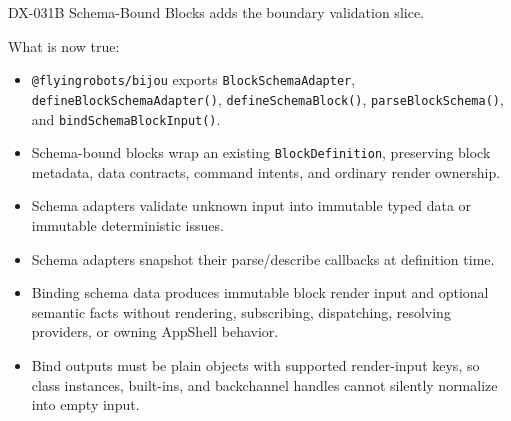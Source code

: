 DX-031B Schema-Bound Blocks adds the boundary validation slice.

What is now true:

\begin{itemize}
\tightlist
\item
  \texttt{@\allowbreak{}f\allowbreak{}l\allowbreak{}y\allowbreak{}i\allowbreak{}n\allowbreak{}g\allowbreak{}r\allowbreak{}o\allowbreak{}b\allowbreak{}o\allowbreak{}t\allowbreak{}s\allowbreak{}/\allowbreak{}b\allowbreak{}i\allowbreak{}j\allowbreak{}o\allowbreak{}u} exports \texttt{B\allowbreak{}l\allowbreak{}o\allowbreak{}c\allowbreak{}k\allowbreak{}S\allowbreak{}c\allowbreak{}h\allowbreak{}e\allowbreak{}m\allowbreak{}a\allowbreak{}A\allowbreak{}d\allowbreak{}a\allowbreak{}p\allowbreak{}t\allowbreak{}e\allowbreak{}r}, \texttt{d\allowbreak{}e\allowbreak{}f\allowbreak{}i\allowbreak{}n\allowbreak{}e\allowbreak{}B\allowbreak{}l\allowbreak{}o\allowbreak{}c\allowbreak{}k\allowbreak{}S\allowbreak{}c\allowbreak{}h\allowbreak{}e\allowbreak{}m\allowbreak{}a\allowbreak{}A\allowbreak{}d\allowbreak{}a\allowbreak{}p\allowbreak{}t\allowbreak{}e\allowbreak{}r\allowbreak{}(\allowbreak{})}, \texttt{d\allowbreak{}e\allowbreak{}f\allowbreak{}i\allowbreak{}n\allowbreak{}e\allowbreak{}S\allowbreak{}c\allowbreak{}h\allowbreak{}e\allowbreak{}m\allowbreak{}a\allowbreak{}B\allowbreak{}l\allowbreak{}o\allowbreak{}c\allowbreak{}k\allowbreak{}(\allowbreak{})}, \texttt{p\allowbreak{}a\allowbreak{}r\allowbreak{}s\allowbreak{}e\allowbreak{}B\allowbreak{}l\allowbreak{}o\allowbreak{}c\allowbreak{}k\allowbreak{}S\allowbreak{}c\allowbreak{}h\allowbreak{}e\allowbreak{}m\allowbreak{}a\allowbreak{}(\allowbreak{})}, and \texttt{b\allowbreak{}i\allowbreak{}n\allowbreak{}d\allowbreak{}S\allowbreak{}c\allowbreak{}h\allowbreak{}e\allowbreak{}m\allowbreak{}a\allowbreak{}B\allowbreak{}l\allowbreak{}o\allowbreak{}c\allowbreak{}k\allowbreak{}I\allowbreak{}n\allowbreak{}p\allowbreak{}u\allowbreak{}t\allowbreak{}(\allowbreak{})}.
\item
  Schema-bound blocks wrap an existing \texttt{B\allowbreak{}l\allowbreak{}o\allowbreak{}c\allowbreak{}k\allowbreak{}D\allowbreak{}e\allowbreak{}f\allowbreak{}i\allowbreak{}n\allowbreak{}i\allowbreak{}t\allowbreak{}i\allowbreak{}o\allowbreak{}n}, preserving block metadata, data contracts, command intents, and ordinary render ownership.
\item
  Schema adapters validate unknown input into immutable typed data or immutable deterministic issues.
\item
  Schema adapters snapshot their parse/describe callbacks at definition time.
\item
  Binding schema data produces immutable block render input and optional semantic facts without rendering, subscribing, dispatching, resolving providers, or owning AppShell behavior.
\item
  Bind outputs must be plain objects with supported render-input keys, so class instances, built-ins, and backchannel handles cannot silently normalize into empty input.
\end{itemize}

